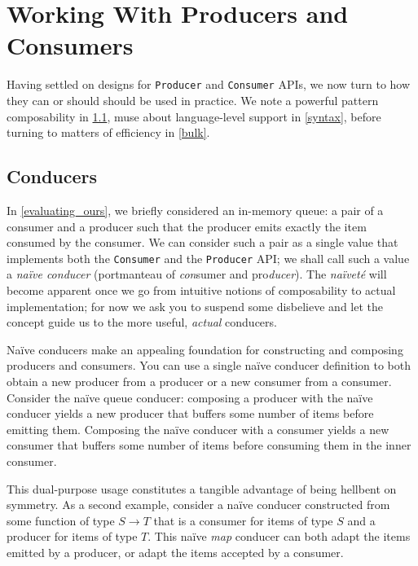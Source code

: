 \documentclass[sigplan,screen,10pt,review]{acmart}
\begin{document}
\section{Working With Producers and Consumers}

Having settled on designs for \texttt{Producer} and \texttt{Consumer} APIs, we now turn to how they can or should should be used in practice. We note a powerful pattern composability in \cref{conducer}, muse about language-level support in \cref{syntax}, before turning to matters of efficiency in \cref{bulk}.

\subsection{Conducers}\label{conducer}

In \cref{evaluating_ours}, we briefly considered an in-memory queue: a pair of a consumer and a producer such that the producer emits exactly the item consumed by the consumer. We can consider such a pair as a single value that implements both the \texttt{Consumer} and the \texttt{Producer} API; we shall call such a value a \textit{naïve conducer} (portmanteau of \textit{con}sumer and pro\textit{ducer}). The \textit{naïveté} will become apparent once we go from intuitive notions of composability to actual implementation; for now we ask you to suspend some disbelieve and let the concept guide us to the more useful, \textit{actual} conducers.

Naïve conducers make an appealing foundation for constructing and composing producers and consumers. You can use a single naïve conducer definition to both obtain a new producer from a producer or a new consumer from a consumer. Consider the naïve queue conducer: composing a producer with the naïve conducer yields a new producer that buffers some number of items before emitting them. Composing the naïve conducer with a consumer yields a new consumer that buffers some number of items before consuming them in the inner consumer.

This dual-purpose usage constitutes a tangible advantage of being hellbent on symmetry. As a second example, consider a naïve conducer constructed from some function of type $S \rightarrow T$ that is a consumer for items of type $S$ and a producer for items of type $T$. This naïve \textit{map} conducer can both adapt the items emitted by a producer, or adapt the items accepted by a consumer.%
\end{document}
